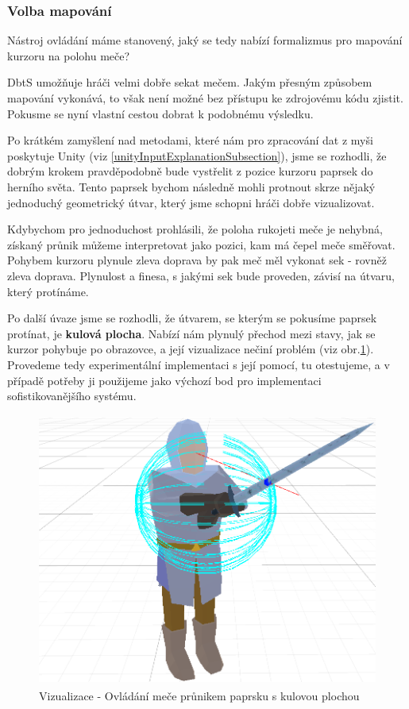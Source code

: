 \subsubsection*{Volba mapování}

Nástroj ovládání máme stanovený, jaký se tedy nabízí formalizmus pro mapování kurzoru na polohu meče?

\acl{DbtS} umožňuje hráči velmi dobře sekat mečem. Jakým přesným způsobem mapování vykonává, to však není možné bez přístupu ke zdrojovému kódu zjistit. Pokusme se nyní vlastní cestou dobrat k podobnému výsledku.

Po krátkém zamyšlení nad metodami, které nám pro zpracování dat z myši poskytuje Unity (viz \ref{unityInputExplanationSubsection}), jsme se rozhodli, že dobrým krokem pravděpodobně bude vystřelit z pozice kurzoru paprsek do herního světa. Tento paprsek bychom následně mohli protnout skrze nějaký jednoduchý geometrický útvar, který jsme schopni hráči dobře vizualizovat. 

Kdybychom pro jednoduchost prohlásili, že poloha rukojeti meče je nehybná, získaný průnik můžeme interpretovat jako pozici, kam má čepel meče směřovat. Pohybem kurzoru plynule zleva doprava by pak meč měl vykonat sek - rovněž zleva doprava. Plynulost a finesa, s jakými sek bude proveden, závisí na útvaru, který protínáme. 

Po další úvaze jsme se rozhodli, že útvarem, se kterým se pokusíme paprsek protínat, je \textbf{kulová plocha}. Nabízí nám plynulý přechod mezi stavy, jak se kurzor pohybuje po obrazovce, a její vizualizace nečiní problém (viz obr.\ref{obr04:sphereVisualization}).
\bigbreak
Provedeme tedy experimentální implementaci s její pomocí, tu otestujeme, a v případě potřeby ji použijeme jako výchozí bod pro implementaci sofistikovanějšího systému.

\begin{figure}[ht]\centering
    \center
    \includegraphics[height=90mm]{../img/IntersectableSphere.png}
    \caption{Vizualizace - Ovládání meče průnikem paprsku s kulovou plochou}
    \label{obr04:sphereVisualization}
\end{figure} 

